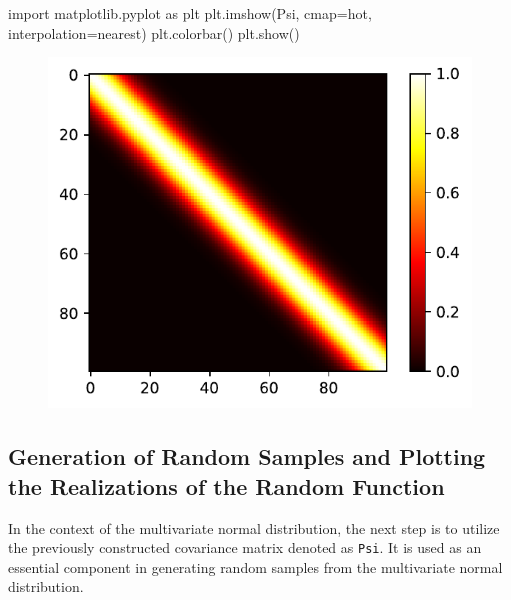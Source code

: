 \documentclass[
  letterpaper,
  DIV=11,
  numbers=noendperiod]{scrreprt}
\newenvironment{Shaded}{\begin{snugshade}}{\end{snugshade}}
\newcommand{\ImportTok}[1]{\textcolor[rgb]{0.00,0.46,0.62}{#1}}
\newcommand{\NormalTok}[1]{\textcolor[rgb]{0.00,0.23,0.31}{#1}}
\newcommand{\OperatorTok}[1]{\textcolor[rgb]{0.37,0.37,0.37}{#1}}
\newcommand{\StringTok}[1]{\textcolor[rgb]{0.13,0.47,0.30}{#1}}
\begin{document}
\begin{Shaded}
\begin{Highlighting}[]
\ImportTok{import}\NormalTok{ matplotlib.pyplot }\ImportTok{as}\NormalTok{ plt}
\NormalTok{plt.imshow(Psi, cmap}\OperatorTok{=}\StringTok{\textquotesingle{}hot\textquotesingle{}}\NormalTok{, interpolation}\OperatorTok{=}\StringTok{\textquotesingle{}nearest\textquotesingle{}}\NormalTok{)}
\NormalTok{plt.colorbar()}
\NormalTok{plt.show()}
\end{Highlighting}
\end{Shaded}

\begin{figure}[H]

{\centering \includegraphics{006_num_gp_files/figure-pdf/cell-27-output-1.pdf}

}

\end{figure}

\hypertarget{generation-of-random-samples-and-plotting-the-realizations-of-the-random-function}{%
\subsection{Generation of Random Samples and Plotting the Realizations
of the Random
Function}\label{generation-of-random-samples-and-plotting-the-realizations-of-the-random-function}}

In the context of the multivariate normal distribution, the next step is
to utilize the previously constructed covariance matrix denoted as
\texttt{Psi}. It is used as an essential component in generating random
samples from the multivariate normal distribution.
\end{document}
